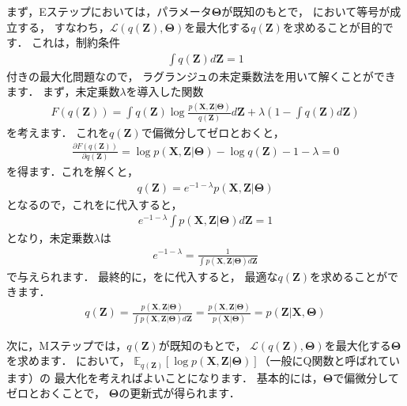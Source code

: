 まず，Eステップにおいては，パラメータ$\bm\Theta$が既知のもとで，
において等号が成立する，
すなわち，$\mathcal{L}(q(\bm{Z}),\bm\Theta)$を最大化する$q(\bm{Z})$を求めることが目的です．
これは，制約条件
\begin{align}
\int q(\bm{Z}) d\bm{Z} = 1
\label{eq:qz_1}
\end{align}
付きの最大化問題なので，
ラグランジュの未定乗数法を用いて解くことができます．
まず，未定乗数$\lambda$を導入した関数
\begin{align}
F(q(\bm{Z}))
 = \int q(\bm{Z}) \log \frac{p(\bm{X},\bm{Z}|\bm\Theta)}{q(\bm{Z})} d\bm{Z}
 + \lambda \left(1 - \int q(\bm{Z}) d\bm{Z}\right)
\end{align}
を考えます．
これを$q(\bm{Z})$で偏微分してゼロとおくと，
\begin{align}
\frac{\partial F(q(\bm{Z}))}{\partial q(\bm{Z})}
= \log p(\bm{X},\bm{Z}|\bm\Theta) - \log q(\bm{Z}) - 1 - \lambda = 0
\end{align}
を得ます．これを解くと，
\begin{align}
q(\bm{Z}) = e^{- 1 - \lambda} p(\bm{X},\bm{Z}|\bm\Theta)
\label{eq:qz}
\end{align}
となるので，これをに代入すると，
\begin{align}
e^{- 1 - \lambda} \int p(\bm{X},\bm{Z}|\bm\Theta) d\bm{Z} = 1
\end{align}
となり，未定乗数$\lambda$は
\begin{align}
e^{- 1 - \lambda} = \frac{1}{\int p(\bm{X},\bm{Z}|\bm\Theta) d\bm{Z}}
\label{eq:lambda}
\end{align}
で与えられます．
最終的に，をに代入すると，
最適な$q(\bm{Z})$を求めることができます．
\begin{align}
q(\bm{Z})
= \frac{p(\bm{X},\bm{Z}|\bm\Theta)}{\int p(\bm{X},\bm{Z}|\bm\Theta) d\bm{Z}}
= \frac{p(\bm{X},\bm{Z}|\bm\Theta)}{p(\bm{X}|\bm\Theta)}
= p(\bm{Z}|\bm{X},\bm\Theta)
\label{eq:p_z_x_theta}
\end{align}

次に，Mステップでは，$q(\bm{Z})$が既知のもとで，
$\mathcal{L}(q(\bm{Z}),\bm\Theta)$を最大化する$\bm\Theta$を求めます．
において，
$\mathbb{E}_{q(\bm{Z})}[\log p(\bm{X},\bm{Z}|\bm\Theta)]$（一般にQ関数と呼ばれています）の
最大化を考えればよいことになります．
基本的には，$\bm\Theta$で偏微分してゼロとおくことで，
$\bm\Theta$の更新式が得られます．


